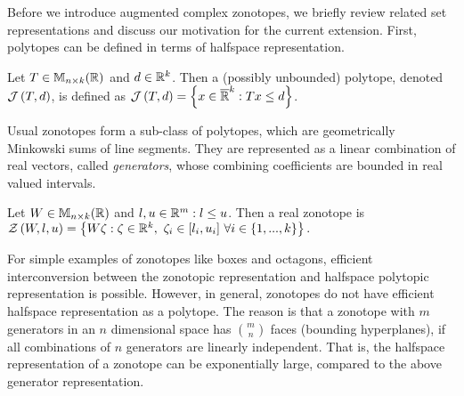 
Before we introduce augmented complex zonotopes, we briefly review
related set representations and discuss our motivation for the
current extension. First, polytopes can be defined in terms of halfspace representation.
%
\begin{definition}
Let $T\in\mathbb{M}_{n\times k}(\mathbb{\mathbb{R}})$ and $d\in\mathbb{R}^k$.  Then a (possibly
unbounded) polytope, denoted $\mathcal{J}\left(T,d\right)$, is defined as
$\mathcal{J}\left(T,d\right) = \left\{x\in\mathbb{\overline{R}}^k: Tx\leq d\right\}$.
\end{definition}
%
Usual zonotopes form a sub-class of polytopes, which are geometrically
Minkowski sums of line segments. They are represented as a linear
combination of real vectors, called \emph{generators}, whose combining
coefficients are bounded in real valued intervals.
\begin{definition}
Let $W\in\mathbb{M}_{n\times k}(\mathbb{\mathbb{R}})$ and $l,u\in\mathbb{R}^m: l\leq u$.  Then 
 a real zonotope is
$\mathcal{Z}\left(W,l,u\right) = \left\{W\zeta: \zeta\in\mathbb{R}^k,~\zeta_i\in[l_i,u_i]~\forall i\in \{1,...,k\}\right\}.$
\end{definition}
%
For simple examples of zonotopes like boxes and octagons, efficient
interconversion between the zonotopic representation and halfspace polytopic representation is possible.  
However, in general,
zonotopes do not have efficient halfspace representation as a
polytope.  The reason is that a zonotope with $m$ generators in an $n$
dimensional space has ${m}\choose{n}$ faces (bounding
hyperplanes), if all combinations of $n$ generators are linearly
independent.  That is, the halfspace representation of a zonotope can
be exponentially large, compared to the above generator representation. 

